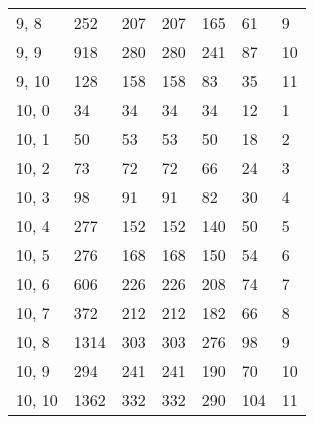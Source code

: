 \begin{table}
\begin{tabular}{lllllll}
9, 8   &        252 &         207 &       207 &         165 &       61 &     9 \\
9, 9   &        918 &         280 &       280 &         241 &       87 &    10 \\
9, 10  &        128 &         158 &       158 &          83 &       35 &    11 \\
10, 0  &         34 &          34 &        34 &          34 &       12 &     1 \\
10, 1  &         50 &          53 &        53 &          50 &       18 &     2 \\
10, 2  &         73 &          72 &        72 &          66 &       24 &     3 \\
10, 3  &         98 &          91 &        91 &          82 &       30 &     4 \\
10, 4  &        277 &         152 &       152 &         140 &       50 &     5 \\
10, 5  &        276 &         168 &       168 &         150 &       54 &     6 \\
10, 6  &        606 &         226 &       226 &         208 &       74 &     7 \\
10, 7  &        372 &         212 &       212 &         182 &       66 &     8 \\
10, 8  &       1314 &         303 &       303 &         276 &       98 &     9 \\
10, 9  &        294 &         241 &       241 &         190 &       70 &    10 \\
10, 10 &       1362 &         332 &       332 &         290 &      104 &    11 \\
\bottomrule
\end{tabular}
\end{table}

